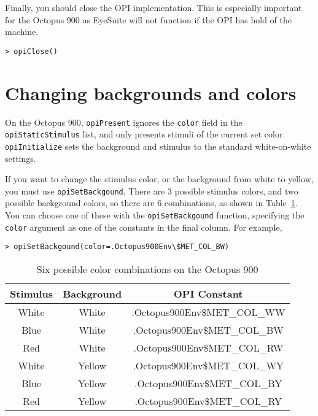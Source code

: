 \documentclass{article}
\begin{document}
Finally, you should close the OPI implementation. This is especially important for the Octopus
900 as EyeSuite will not function if the OPI has hold of the machine.

\begin{verbatim}
> opiClose()
\end{verbatim}



\section{Changing backgrounds and colors}

On the Octopus 900, {\tt opiPresent} ignores the {\tt color} field in the {\tt
opiStaticStimulus} list, and only presents stimuli of the current
set color.
{\tt opiInitialize} sets the background and
stimulus to the standard white-on-white settings.

If you want to change the stimulus color, or the background from
white to yellow, you must use {\tt opiSetBackgound}. There are 3
possible stimulus colors, and two possible background colors, so
there are 6 combinations, as shown in Table~\ref{tab-met-col}.
You can choose one of these with the {\tt opiSetBackgound} function, specifying the {\tt color}
argument as one of the constants in the final column.
For example,
\begin{verbatim}
> opiSetBackgound(color=.Octopus900Env\$MET_COL_BW)
\end{verbatim}

\begin{table}
\centering
\begin{tabular}{ccc}
\hline
Stimulus & Background & OPI Constant \\
\hline
White    & White &  .Octopus900Env\$MET\_COL\_WW \\
Blue     & White &  .Octopus900Env\$MET\_COL\_BW \\
Red      & White &  .Octopus900Env\$MET\_COL\_RW \\
White    & Yellow & .Octopus900Env\$MET\_COL\_WY \\
Blue     & Yellow & .Octopus900Env\$MET\_COL\_BY \\
Red      & Yellow & .Octopus900Env\$MET\_COL\_RY \\
\hline
\end{tabular}
\caption{\label{tab-met-col}Six possible color combinations on the Octopus 900}
\end{table}
\end{document}
